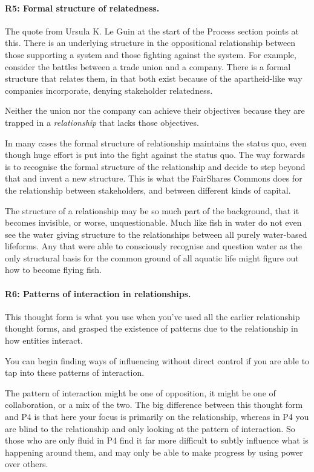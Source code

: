 \paragraph{\textbf{R5: Formal structure of relatedness.}}
The quote from Ursula K. Le Guin  at the start of the Process section points at this. There is an underlying structure in the oppositional relationship between those supporting a system and those fighting against the system. For example, consider the battles between a trade union and a company. There is a formal structure that relates them, in that both exist because of the apartheid-like way companies  incorporate, denying stakeholder relatedness. 


Neither the union nor the company can achieve their objectives because they are trapped in a \emph{relationship} that lacks those objectives.


In many cases the formal structure of relationship maintains the status quo, even though huge effort is put into the fight against the status quo. The way forwards is to recognise the formal structure of the relationship and decide to step beyond that and invent a new structure. This is what the FairShares Commons  does for the relationship between stakeholders, and between different kinds of capital.


The structure of a relationship may be so much part of the background, that it becomes invisible, or worse, unquestionable. Much like fish in water do not even see the water giving structure to the relationships between all purely water-based lifeforms. Any that were able to consciously recognise and question water as the only structural basis for the common ground of all aquatic life might figure out how to become flying fish.
\paragraph{\textbf{R6: Patterns of interaction in relationships.}}
This thought form is what you use when you’ve used all the earlier relationship thought forms, and grasped the existence of patterns due to the relationship in how entities interact.


You can begin finding ways of influencing without direct control if you are able to tap into these patterns of interaction.


The pattern of interaction might be one of opposition, it might be one of collaboration, or a mix of the two. The big difference between this thought form and P4 is that here your focus is primarily on the relationship, whereas in P4 you are blind to the relationship and only looking at the pattern of interaction. So those who are only fluid in P4 find it far more difficult to subtly influence what is happening around them, and may only be able to make progress by using power over others.
